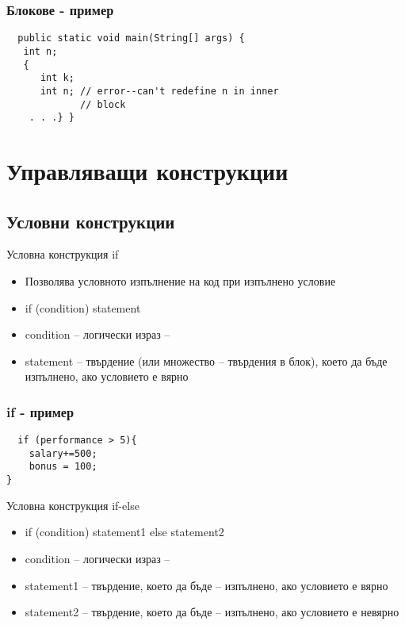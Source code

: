 \documentclass{beamer}
\begin{document}
\begin{frame}[fragile]
  \frametitle{Блокове - пример}
\begin{lstlisting}
  public static void main(String[] args) {
   int n;
   {
      int k;
      int n; // error--can't redefine n in inner
             // block
    . . .} }

\end{lstlisting}
\end{frame}

\section{Управляващи конструкции}

\subsection{Условни конструкции}

\begin{frame}{Условна конструкция if}
  \begin{itemize}
  \item Позволява условното изпълнение на код при изпълнено условие
  \item   if (condition) statement
  \item  condition – логически израз
    –
  \item  statement – твърдение (или множество
    –
    твърдения в блок), което да бъде
    изпълнено, ако условието е вярно

  \end{itemize}
\end{frame}


\begin{frame}[fragile]
  \frametitle{if - пример}
\begin{lstlisting}
  if (performance > 5){
    salary+=500;
    bonus = 100;
}

\end{lstlisting}
\end{frame}

\begin{frame}{Условна конструкция if-else}
  \begin{itemize}
  \item   if (condition) statement1 else statement2
    \item condition – логически израз
    –
    \item statement1 – твърдение, което да бъде
    –
    изпълнено, ако условието е вярно
    \item statement2 – твърдение, което да бъде
    –
    изпълнено, ако условието е невярно

  \end{itemize}
\end{frame}
\end{document}
